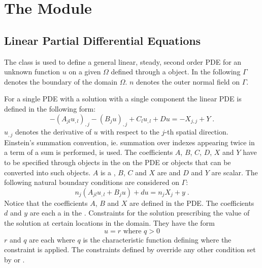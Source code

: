 
%
%
%


\chapter{The \linearPDEs Module}

\section{Linear Partial Differential Equations}
\label{SEC LinearPDE}

The \LinearPDE class is used to define a general linear, steady, second order PDE
for an unknown function $u$ on a given $\Omega$ defined through a \Domain object.
In the following $\Gamma$ denotes the boundary of the domain $\Omega$. $n$ denotes
the outer normal field on $\Gamma$.

For a single PDE with a solution with a single component the linear PDE is defined in the
following form:
\begin{equation}\label{LINEARPDE.SINGLE.1}
-(A_{jl} u_{,l})_{,j}-(B_{j} u)_{,j}+C_{l} u_{,l}+D u =-X_{j,j}+Y \; .
\end{equation}
$u_{,j}$ denotes the derivative of $u$ with respect to the $j$-th spatial direction. Einstein's summation convention, ie. summation over indexes appearing twice in a term of a sum is performed, is used.
The coefficients $A$, $B$, $C$, $D$, $X$ and $Y$ have to be specified through \Data objects in the
\Function on the PDE or objects that can be converted into such \Data objects.
$A$ is a \RankTwo, $B$, $C$ and $X$ are \RankOne and $D$ and $Y$ are scalar.
The following natural
boundary conditions are considered  on $\Gamma$:
\begin{equation}\label{LINEARPDE.SINGLE.2}
n_{j}(A_{jl} u_{,l}+B_{j} u)+d u=n_{j}X_{j} + y  \;.
\end{equation}
Notice that the coefficients $A$, $B$ and $X$ are defined in the PDE. The coefficients $d$ and $y$ are
each a \Scalar in the \FunctionOnBoundary.  Constraints  for the solution prescribing the value of the
solution at certain locations in the domain. They have the form
\begin{equation}\label{LINEARPDE.SINGLE.3}
u=r \mbox{ where } q>0
\end{equation}
$r$ and $q$ are each \Scalar where $q$ is the characteristic function
 defining where the constraint is applied.
The constraints defined by  override any other condition set by 
or .

